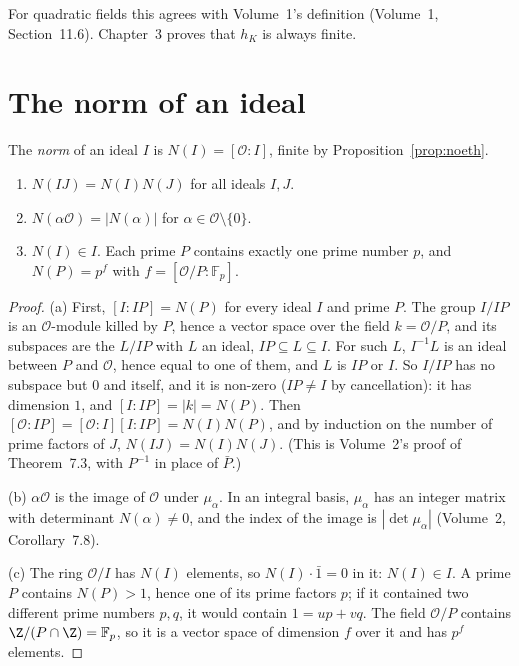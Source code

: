 For quadratic fields this agrees with Volume~1's definition (Volume~1, Section~11.6). Chapter~3 proves that $h_K$ is
always finite.

\section{The norm of an ideal}

\begin{definition}
The \emph{norm} of an ideal $I$ is $N(I)=[\mathcal O:I]$, finite by Proposition~\ref{prop:noeth}.
\end{definition}

\begin{proposition}\label{prop:normideal}
\begin{enumerate}[label=(\alph*)]
\item $N(IJ)=N(I)N(J)$ for all ideals $I,J$.
\item $N(\alpha\mathcal O)=|N(\alpha)|$ for $\alpha\in\mathcal O\setminus\{0\}$.
\item $N(I)\in I$. Each prime $P$ contains exactly one prime number $p$, and $N(P)=p^f$ with $f=[\mathcal O/P:\mathbb F_p]$.
\end{enumerate}
\end{proposition}
\begin{proof}
(a) First, $[I:IP]=N(P)$ for every ideal $I$ and prime $P$. The group $I/IP$ is an $\mathcal O$-module killed by $P$,
hence a vector space over the field $k=\mathcal O/P$, and its subspaces are the $L/IP$ with $L$ an ideal, $IP\subseteq
L\subseteq I$. For such $L$, $I^{-1}L$ is an ideal between $P$ and $\mathcal O$, hence equal to one of them, and $L$ is
$IP$ or $I$. So $I/IP$ has no subspace but $0$ and itself, and it is non-zero ($IP\ne I$ by cancellation): it has
dimension $1$, and $[I:IP]=|k|=N(P)$. Then $[\mathcal O:IP]=[\mathcal O:I][I:IP]=N(I)N(P)$, and by induction on the
number of prime factors of $J$, $N(IJ)=N(I)N(J)$. (This is Volume~2's proof of Theorem~7.3, with $P^{-1}$ in place of $\bar
P$.)

(b) $\alpha\mathcal O$ is the image of $\mathcal O$ under $\mu_\alpha$. In an integral basis, $\mu_\alpha$ has an integer
matrix with determinant $N(\alpha)\ne0$, and the index of the image is $|\det\mu_\alpha|$ (Volume~2, Corollary~7.8).

(c) The ring $\mathcal O/I$ has $N(I)$ elements, so $N(I)\cdot\bar1=0$ in it: $N(I)\in I$. A prime $P$ contains
$N(P)>1$, hence one of its prime factors $p$; if it contained two different prime numbers $p,q$, it would contain
$1=up+vq$. The field $\mathcal O/P$ contains $\Z/(P\cap\Z)=\mathbb F_p$, so it is a vector space of dimension
$f$ over it and has $p^f$ elements.
\end{proof}

